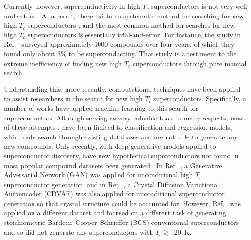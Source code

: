 \documentclass[%
reprint,
 amsmath,amssymb,
 aps,
prb,
]{revtex4-2}
\begin{document}
Currently, however, superconductivity in high $T_c$ superconductors is not very well understood. As a result, there exists no systematic method for searching for new high $T_c$ superconductors \cite{HIRSCH20151}, and the most common method for searches for new high $T_c$ superconductors is essentially trial-and-error. For instance, the study in Ref.~\cite{Hosono2015} surveyed approximately 1000 compounds over four years, of which they found only about $3\%$ to be superconducting. That study is a testament to the extreme inefficiency of finding new high $T_c$ superconductors through pure manual search.

Understanding this, more recently, computational techniques have been applied to assist researchers in the search for new high $T_c$ superconductors. Specifically, a number of works have applied machine learning to this search for superconductors. Although serving as very valuable tools in many respects, most of these attempts \cite{Stanev2018, ROTER20201353689, PhysRevB.103.014509}, have been limited to classification and regression models, which only search through existing databases and are not able to generate any new compounds. Only recently, with deep generative models applied to superconductor discovery, have new hypothetical superconductors not found in most popular compound datasets been generated \cite{Kim_2024, wines2023cdvae, zhongdiffsupercon}. In Ref.~\cite{Kim_2024}, a Generative Adversarial Network (GAN) \cite{goodfellow2014} was applied for unconditional high $T_c$ superconductor generation, and in Ref.~\cite{wines2023cdvae}, a Crystal Diffusion Variational Autoencoder (CDVAE) \cite{xie2021crystal} was also applied for unconditional superconductor generation so that crystal structure could be accounted for. However, Ref.~\cite{wines2023cdvae} was applied on a different dataset and focused on a different task of generating stoichiometric Bardeen–Cooper–Schrieffer (BCS) conventional superconductors \cite{PhysRev.106.162} and so did not generate any superconductors with $T_c \gtrsim$~20~K.
\end{document}
